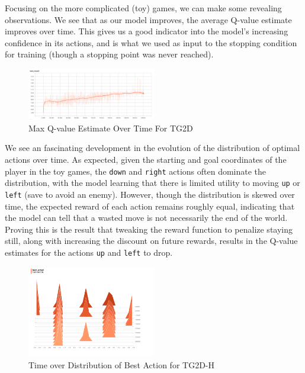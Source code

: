 \documentclass[9pt,journal]{IEEEtran}
\begin{document}
Focusing on the more complicated (toy) games, we can make some revealing observations. We see that as our model improves, the average Q-value estimate improves over time. This gives us a good indicator into the model's increasing confidence in its actions, and is what we used as input to the stopping condition for training (though a stopping point was never reached).

\begin{figure}[ht]
  \includegraphics[width=0.5\textwidth]{report/TG2D_best_reward}
  \centering
  \caption{Max Q-value Estimate Over Time For TG2D}
  \label{fig:maxqv}
\end{figure}

We see an fascinating development in the evolution of the distribution of optimal actions over time. As expected, given the starting and goal coordinates of the player in the toy games, the \texttt{down} and \texttt{right} actions often dominate the distribution, with the model learning that there is limited utility to moving \texttt{up} or \texttt{left} (save to avoid an enemy). However, though the distribution is skewed over time, the expected reward of each action remains roughly equal, indicating that the model can tell that a wasted move is not necessarily the end of the world. Proving this is the result that tweaking the reward function to penalize staying still, along with increasing the discount on future rewards, results in the Q-value estimates for the actions \texttt{up} and \texttt{left} to drop.

\begin{figure}[ht]
  \includegraphics[width=0.5\textwidth]{report/TG2D-H_best_action_hist}
  \centering
  \caption{Time over Distribution of Best Action for TG2D-H}
  \label{fig:bahist}
\end{figure}
\end{document}
